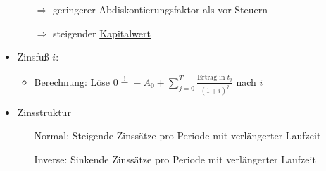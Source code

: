 \begin{itemize}
\begin{itemize}
				\item[$\Rightarrow$] geringerer Abdiskontierungsfaktor als vor Steuern
				\item[$\Rightarrow$] steigender \hyperref[Kapitalwert]{Kapitalwert}
			\end{itemize}
		\item Zinsfuß $i$: \label{Zinsfuss}
			\begin{itemize}
				\item Berechnung: Löse $0 \stackrel{!}{=} -A_0 + \sum_{j=0}^T \frac{\text{Ertrag in }t_j}{(1+i)^j}$ nach $i$
			\end{itemize}
		\item Zinsstruktur \label{Zinsstruktur}
			\begin{itemize}
				\setlength{\itemindent}{1cm}
				\item[Normal:] Steigende Zinssätze pro Periode mit verlängerter Laufzeit
				\item[Inverse:] Sinkende Zinssätze pro Periode mit verlängerter Laufzeit
			\end{itemize}
	\end{itemize}